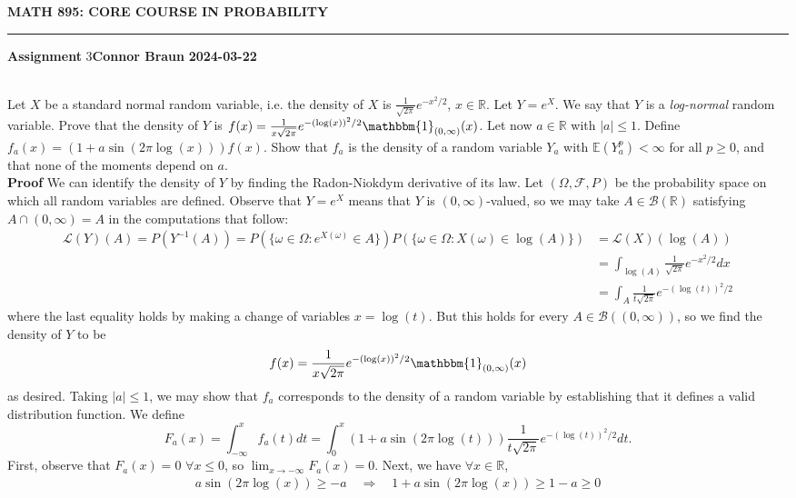 \documentclass[10pt]{article}
\newcommand{\E}{\mathbb{E}}
\newcommand{\mbb}[1]{\mathbb{#1}}
\newcommand{\1}[1]{\mathbbm{1}_{#1}}
\newcommand{\mc}[1]{\mathcal{#1}}
\begin{document}
    \begin{center}
        {\bf\large{MATH 895: CORE COURSE IN PROBABILITY}}
        \smallskip
        \hrule
        \smallskip
        {\bf Assignment} 3\hfill {\bf Connor Braun} \hfill {\bf 2024-03-22}
    \end{center}
    \\[5pt]
    Let $X$ be a standard normal random variable, i.e. the density of $X$ is $\tfrac{1}{\sqrt{2\pi}}e^{-x^2/2}$, $x\in\mbb{R}$. Let $Y=e^X$. We say that $Y$ is a {\it log-normal} random variable.
    Prove that the density of $Y$ is $f(x)=\tfrac{1}{x\sqrt{2\pi}}e^{-(\log(x))^2/2}\1{(0,\infty)}(x)$. Let now $a\in\mbb{R}$ with $|a|\leq1$. Define $f_a(x)=(1+a\sin(2\pi\log(x)))f(x)$. Show that $f_a$ is the density of a random variable $Y_a$
    with $\E{(Y_a^p)}<\infty$ for all $p\geq0$, and that none of the moments depend on $a$.\\[5pt]
    {\bf Proof} We can identify the density of $Y$ by finding the Radon-Niokdym derivative of its law. Let $(\Omega,\mc{F},P)$ be the probability space on which all random variables are defined. Observe that $Y=e^X$ means that $Y$ is $(0,\infty)$-valued,
    so we may take $A\in\mc{B}(\mbb{R})$ satisfying $A\cap(0,\infty)=A$ in the computations that follow:
    \begin{align*}
        \mc{L}(Y)(A)=P(Y^{-1}(A))=P(\{\omega\in\Omega:e^{X(\omega)}\in A\})P(\{\omega\in\Omega:X(\omega)\in\log(A)\})&=\mc{L}(X)(\log(A))\\
        &=\int_{\log(A)}\frac{1}{\sqrt{2\pi}}e^{-x^2/2}dx\\
        &=\int_A\frac{1}{t\sqrt{2\pi}}e^{-(\log(t))^2/2}
    \end{align*}
    where the last equality holds by making a change of variables $x=\log(t)$. But this holds for every $A\in\mc{B}((0,\infty))$, so we find the density of $Y$ to be
    \begin{align*}
        f(x)=\frac{1}{x\sqrt{2\pi}}e^{-(\log(x))^2/2}\1{(0,\infty)}(x)
    \end{align*}
    as desired. Taking $|a|\leq1$, we may show that $f_a$ corresponds to the density of a random variable by establishing that it defines a valid distribution function. We define
    \[F_a(x)=\int_{-\infty}^xf_a(t)dt=\int_{0}^x(1+a\sin(2\pi\log(t)))\frac{1}{t\sqrt{2\pi}}e^{-(\log(t))^2/2}dt.\] 
    First, observe that $F_a(x)=0$ $\forall x\leq 0$, so $\lim_{x\rightarrow-\infty}F_a(x)=0$. Next, we have $\forall x\in\mbb{R}$,
    \begin{align*}
        a\sin(2\pi\log(x))\geq -a\quad\Rightarrow\quad 1+a\sin(2\pi\log(x))\geq 1-a\geq 0
    \end{align*}
\end{document}
